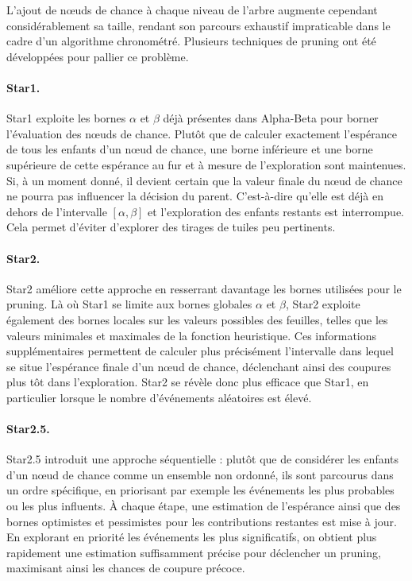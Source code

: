\documentclass[11pt]{article}
\begin{document}
L'ajout de nœuds de chance à chaque niveau de l'arbre augmente 
cependant considérablement sa taille, rendant son parcours exhaustif 
impraticable dans le cadre d'un algorithme chronométré. Plusieurs 
techniques de pruning ont été développées pour pallier ce problème.

\paragraph{Star1.}

Star1 exploite les bornes $\alpha$ et $\beta$ déjà présentes dans 
Alpha-Beta pour borner l'évaluation des nœuds de chance. Plutôt que 
de calculer exactement l'espérance de tous les enfants d'un nœud de 
chance, une borne inférieure et une borne supérieure de 
cette espérance au fur et à mesure de l'exploration sont maintenues. Si, à un moment 
donné, il devient certain que la valeur finale du nœud de chance ne 
pourra pas influencer la décision du parent. C'est-à-dire qu'elle 
est déjà en dehors de l'intervalle $[\alpha, \beta]$ et l'exploration 
des enfants restants est interrompue. Cela permet d'éviter d'explorer 
des tirages de tuiles peu pertinents.

\paragraph{Star2.}

Star2 améliore cette approche en resserrant davantage les bornes 
utilisées pour le pruning. Là où Star1 se limite aux bornes globales 
$\alpha$ et $\beta$, Star2 exploite également des bornes locales sur 
les valeurs possibles des feuilles, telles que les valeurs minimales 
et maximales de la fonction heuristique. Ces informations 
supplémentaires permettent de calculer plus précisément l'intervalle 
dans lequel se situe l'espérance finale d'un nœud de chance, 
déclenchant ainsi des coupures plus tôt dans l'exploration. Star2 
se révèle donc plus efficace que Star1, en particulier lorsque le 
nombre d'événements aléatoires est élevé.

\paragraph{Star2.5.}

Star2.5 introduit une approche séquentielle : plutôt que de 
considérer les enfants d'un nœud de chance comme un ensemble non 
ordonné, ils sont parcourus dans un ordre spécifique, en priorisant 
par exemple les événements les plus probables ou les plus influents. 
À chaque étape, une estimation de l'espérance ainsi 
que des bornes optimistes et pessimistes pour les contributions 
restantes est mise à jour. En explorant en priorité les événements les plus 
significatifs, on obtient plus rapidement une estimation suffisamment 
précise pour déclencher un pruning, maximisant ainsi les chances de 
coupure précoce.
\end{document}
